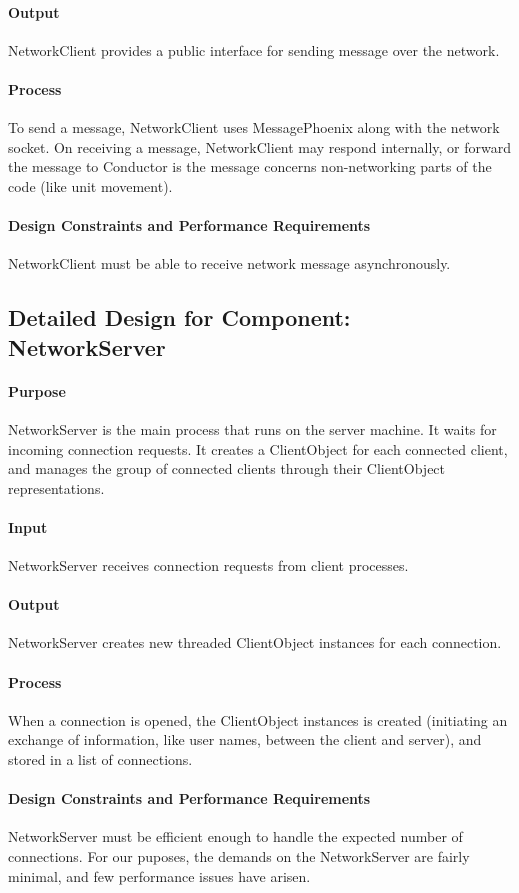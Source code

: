 \documentclass[12pt,a4paper]{article}
\begin{document}
\paragraph{Output} NetworkClient provides a public interface for sending message over the network.
\paragraph{Process} To send a message, NetworkClient uses MessagePhoenix along with the network socket. On receiving a message, NetworkClient may respond internally, or forward the message to Conductor is the message concerns non-networking parts of the code (like unit movement).
\paragraph{Design Constraints and Performance Requirements}
NetworkClient must be able to receive network message asynchronously. 

\subsection{Detailed Design for Component: NetworkServer }
\paragraph{Purpose} NetworkServer is the main process that runs on the server machine. It waits for incoming connection requests. It creates a ClientObject for each connected client, and manages the group of connected clients through their ClientObject representations. 
\paragraph{Input} NetworkServer receives connection requests from client processes.
\paragraph{Output} NetworkServer creates new threaded ClientObject instances for each connection.
\paragraph{Process} When a connection is opened, the ClientObject instances is created (initiating an exchange of information, like user names, between the client and server), and stored in a list of connections.
\paragraph{Design Constraints and Performance Requirements} NetworkServer must be efficient enough to handle the expected number of connections. For our puposes, the demands on the NetworkServer are fairly minimal, and few performance issues have arisen.
\end{document}
